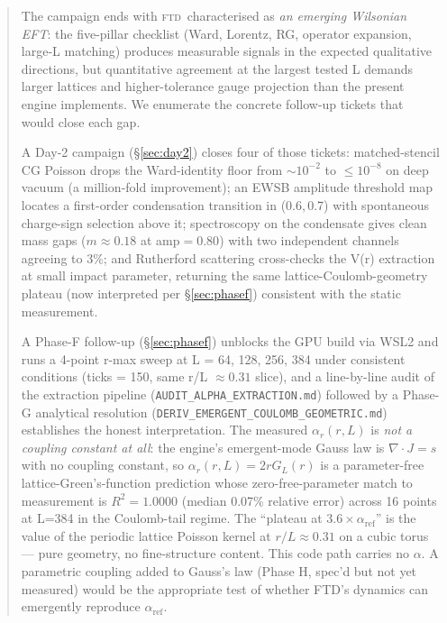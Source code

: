 \documentclass[11pt,letterpaper]{article}
\newcommand{\FTD}{\textsc{ftd}}
\begin{document}
\begin{abstract}
The campaign ends with \FTD\ characterised as \emph{an emerging Wilsonian
EFT}: the five-pillar checklist (Ward, Lorentz, RG, operator expansion,
large-L matching) produces measurable signals in the expected qualitative
directions, but quantitative agreement at the largest tested L demands
larger lattices and higher-tolerance gauge projection than the present
engine implements.
We enumerate the concrete follow-up tickets that would close each gap.

A Day-2 campaign (\S\ref{sec:day2}) closes four of those tickets:
matched-stencil CG Poisson drops the Ward-identity floor from $\sim 10^{-2}$
to $\le 10^{-8}$ on deep vacuum (a million-fold improvement); an EWSB
amplitude threshold map locates a first-order condensation transition
in (0.6,\,0.7) with spontaneous charge-sign selection above it; spectroscopy
on the condensate gives clean mass gaps ($m \approx 0.18$ at amp$=0.80$)
with two independent channels agreeing to 3\%; and Rutherford scattering
cross-checks the V(r) extraction at small impact parameter, returning
the same lattice-Coulomb-geometry plateau (now interpreted per
\S\ref{sec:phasef}) consistent with the static measurement.

A Phase-F follow-up (\S\ref{sec:phasef}) unblocks the GPU build via
WSL2 and runs a 4-point r-max sweep at L = 64, 128, 256, 384 under
consistent conditions (ticks = 150, same r/L $\approx 0.31$ slice), and
a line-by-line audit of the extraction pipeline
(\texttt{AUDIT\_ALPHA\_EXTRACTION.md}) followed by a Phase-G analytical
resolution (\texttt{DERIV\_EMERGENT\_COULOMB\_GEOMETRIC.md}) establishes
the honest interpretation. The measured $\alpha_r(r, L)$ is
\emph{not a coupling constant at all}: the engine's emergent-mode Gauss law is
$\nabla \cdot J = s$ with no coupling constant, so
$\alpha_r(r, L) = 2 r G_L(r)$ is a parameter-free lattice-Green's-function
prediction whose zero-free-parameter match to measurement is $R^2 =
1.0000$ (median 0.07\% relative error) across 16 points at L=384 in the
Coulomb-tail regime. The ``plateau at $3.6\times \alpha_{\text{ref}}$'' is
the value of the periodic lattice Poisson kernel at $r/L \approx 0.31$ on
a cubic torus --- pure geometry, no fine-structure content. This code
path carries no $\alpha$. A parametric coupling added to Gauss's law
(Phase H, spec'd but not yet measured) would be the appropriate test of
whether FTD's dynamics can emergently reproduce $\alpha_{\text{ref}}$.
\end{abstract}

\end{document}
